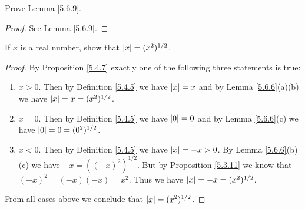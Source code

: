 \begin{exercise}\label{ex 5.6.2}
    Prove Lemma \ref{5.6.9}.
\end{exercise}

\begin{proof}
    See Lemma \ref{5.6.9}.
\end{proof}

\begin{exercise}\label{ex 5.6.3}
    If \(x\) is a real number, show that \(\abs*{x} = (x^2)^{1 / 2}\).
\end{exercise}

\begin{proof}
    By Proposition \ref{5.4.7} exactly one of the following three statements is true:
    \begin{enumerate}
        \item \(x > 0\).
              Then by Definition \ref{5.4.5} we have \(\abs*{x} = x\) and by Lemma \ref{5.6.6}(a)(b) we have \(\abs*{x} = x = (x^2)^{1 / 2}\).
        \item \(x = 0\).
              Then by Definition \ref{5.4.5} we have \(\abs*{0} = 0\) and by Lemma \ref{5.6.6}(c) we have \(\abs*{0} = 0 = (0^2)^{1 / 2}\).
        \item \(x < 0\).
              Then by Definition \ref{5.4.5} we have \(\abs*{x} = -x > 0\).
              By Lemma \ref{5.6.6}(b)(c) we have \(-x = ((-x)^2)^{1 / 2}\).
              But by Proposition \ref{5.3.11} we know that \((-x)^2 = (-x)(-x) = x^2\).
              Thus we have \(\abs*{x} = -x = (x^2)^{1 / 2}\).
    \end{enumerate}
    From all cases above we conclude that \(\abs*{x} = (x^2)^{1 / 2}\).
\end{proof}